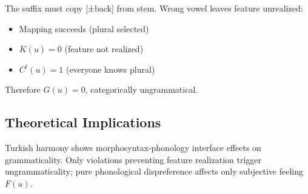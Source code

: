 \documentclass[12pt]{article}
\begin{document}
\ea
{}
\z
\z
The suffix must copy [±back] from stem. Wrong vowel leaves feature unrealized:
\begin{itemize}
\item Mapping succeeds (plural selected)
\item $K(u) = 0$ (feature not realized)
\item $C^t(u) = 1$ (everyone knows plural)
\end{itemize}

Therefore $G(u) = 0$, categorically ungrammatical.

\subsection{Theoretical Implications}

Turkish harmony shows morphosyntax-phonology interface effects on grammaticality. Only violations preventing feature realization trigger ungrammaticality; pure phonological dispreference affects only subjective feeling $F(u)$.

 \newpage
\begin{sloppypar}
\printbibliography[title=References]
\end{sloppypar}
\end{document}
